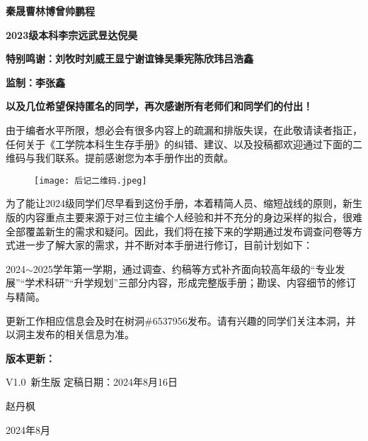 \documentclass[11pt,oneside]{book}
\begin{document}
\textbf{\hspace{82pt}秦\hspace{11pt}晟\hspace{6pt}曹林博\hspace{6pt}曾帅鹏程}

\textbf{2023级本科\hspace{20pt}李宗远\hspace{6pt}武昱达\hspace{6pt}倪\hspace{11pt}昊}

\textbf{特别鸣谢：刘牧时\hspace{6pt}刘\hspace{11pt}威\hspace{6pt}王显宁\hspace{6pt}谢谊锋\hspace{6pt}吴秉宪\hspace{6pt}陈欣玮\hspace{6pt}吕浩鑫}

\textbf{监制：李张鑫}

\textbf{以及几位希望保持匿名的同学，再次感谢所有老师们和同学们的付出！}
 

由于编者水平所限，想必会有很多内容上的疏漏和排版失误，在此敬请读者指正，任何关于《工学院本科生生存手册》的纠错、建议、以及投稿都欢迎通过下面的二维码与我们联系。提前感谢您为本手册作出的贡献。
\begin{figure}[htbp]
    \centering
    \texttt{[image: 后记二维码.jpeg]}
\end{figure}

为了能让2024级同学们尽早看到这份手册，本着精简人员、缩短战线的原则，新生版的内容重点主要来源于对三位主编个人经验和并不充分的身边采样的拟合，很难全部覆盖新生的需求和疑问。因此，我们将在接下来的学期通过发布调查问卷等方式进一步了解大家的需求，并不断对本手册进行修订，目前计划如下：

2024$\sim$2025学年第一学期，通过调查、约稿等方式补齐面向较高年级的“专业发展”“学术科研”“升学规划”三部分内容，形成完整版手册；勘误、内容细节的修订与精简。

更新工作相应信息会及时在树洞\#6537956发布。请有兴趣的同学们关注本洞，并以洞主发布的相关信息为准。

\textbf{版本更新：}

V1.0\ 新生版 定稿日期：2024年8月16日

\begin{flushright}
    赵丹枫

    2024年8月
\end{flushright}
\end{document}
